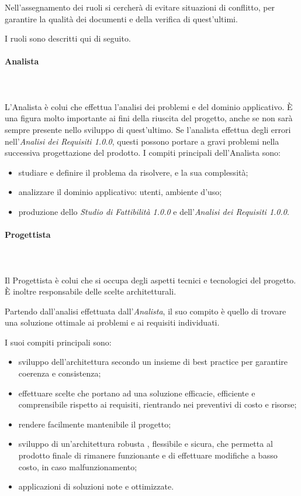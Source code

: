    			Nell'assegnamento dei ruoli si cercherà di evitare situazioni di conflitto, per garantire la qualità dei documenti e della verifica di quest'ultimi.

   			I ruoli sono descritti qui di seguito.
   			\paragraph{Analista} \mbox{}\\ \mbox{}\\
   				L'Analista è colui che effettua l'analisi dei problemi e del dominio applicativo. \`{E} una figura molto importante ai fini della riuscita del progetto, anche se non sarà sempre presente nello sviluppo di quest'ultimo. Se l'analista effettua degli errori nell'\textit{Analisi dei Requisiti 1.0.0}, questi possono portare a gravi problemi nella successiva progettazione del prodotto.
   				I compiti principali dell'Analista sono:
   				\begin{itemize}
   					\item studiare e definire il problema da risolvere, e la sua complessità;
   					\item analizzare il dominio applicativo: utenti, ambiente d'uso;
   					\item produzione dello \textit{Studio di Fattibilità 1.0.0} e  dell'\textit{Analisi dei Requisiti 1.0.0}.
   				\end{itemize}
   			\paragraph{Progettista} \mbox{}\\ \mbox{}\\
   			Il Progettista è colui che si occupa degli aspetti tecnici e tecnologici del progetto. \`{E} inoltre responsabile delle scelte architetturali.

   			Partendo dall'analisi effettuata dall'\textit{Analista}, il suo compito è quello di trovare una soluzione ottimale ai problemi e ai requisiti individuati.

   			I suoi compiti principali sono:
   			\begin{itemize}
   				\item sviluppo dell'architettura secondo un insieme di best practice per garantire coerenza e consistenza;
   				\item effettuare scelte che portano ad una soluzione efficacie, efficiente e comprensibile rispetto ai requisiti, rientrando nei preventivi di costo e risorse;
   				\item rendere facilmente mantenibile il progetto;
   				\item sviluppo di un'architettura robusta , flessibile e sicura, che permetta al prodotto finale di rimanere funzionante e di effettuare modifiche a basso costo, in caso malfunzionamento;
   				\item applicazioni di soluzioni note e ottimizzate.
   			\end{itemize}
